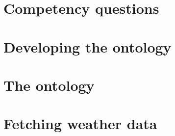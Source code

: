 \section{Competency questions}

\section{Developing the ontology}

\section{The ontology}

\section{Fetching weather data}
